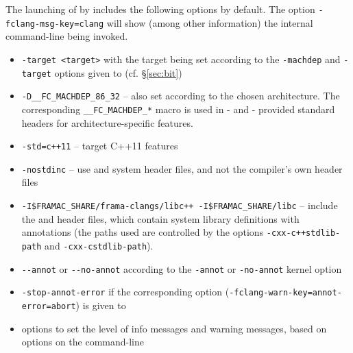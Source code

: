 The launching of \irg by \framac includes the following options by default. The \fc option \lstinline|-fclang-msg-key=clang| will show (among other information) the internal command-line being invoked.
\begin{itemize}
\item \verb|-target <target>| with the target being set according to
  the \lstinline|-machdep| and \lstinline|-target| options given to
  \framac (cf. \S\ref{sec:bit})
\item \verb|-D__FC_MACHDEP_86_32| -- also set according to the chosen
  architecture. The corresponding \verb|__FC_MACHDEP_*| macro is used in
  \framac- and \fcl- provided standard headers for architecture-specific
  features.
\item \verb|-std=c++11| -- target C++11 features
\item \verb|-nostdinc| -- use \fcl and \framac system header files, and not the compiler's own header files
\item \verb|-I$FRAMAC_SHARE/frama-clangs/libc++ -I$FRAMAC_SHARE/libc| -- include the \fclang and \framac header files, which contain system library definitions with \acslpp annotations (the paths used are controlled by the \fc options \lstinline|-cxx-c++stdlib-path| and \lstinline|-cxx-cstdlib-path|).
\item \verb|--annot| or \verb|--no-annot| according to the \verb|-annot| or \verb|-no-annot| \framac kernel option
\item \verb|-stop-annot-error| if the corresponding option (\lstinline|-fclang-warn-key=annot-error=abort|) is given to \framac
\item options to set the level of info messages and warning messages, based on options on the \fc command-line
\end{itemize}

